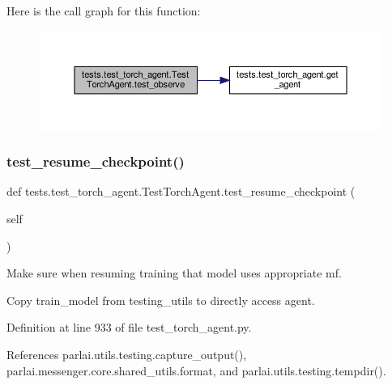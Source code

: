Here is the call graph for this function\+:
\nopagebreak
\begin{figure}[H]
\begin{center}
\leavevmode
\includegraphics[width=350pt]{classtests_1_1test__torch__agent_1_1TestTorchAgent_ae3b6e4145176ba5d5e9179756d064332_cgraph}
\end{center}
\end{figure}
\mbox{\label{classtests_1_1test__torch__agent_1_1TestTorchAgent_a7135ee3421b1d0fc98f0202718910482}} 
\subsubsection{\texorpdfstring{test\+\_\+resume\+\_\+checkpoint()}{test\_resume\_checkpoint()}}
{\footnotesize\ttfamily def tests.\+test\+\_\+torch\+\_\+agent.\+Test\+Torch\+Agent.\+test\+\_\+resume\+\_\+checkpoint (\begin{DoxyParamCaption}\item[{}]{self }\end{DoxyParamCaption})}

\begin{DoxyVerb}Make sure when resuming training that model uses appropriate mf.

Copy train_model from testing_utils to directly access agent.
\end{DoxyVerb}
 

Definition at line 933 of file test\+\_\+torch\+\_\+agent.\+py.



References parlai.\+utils.\+testing.\+capture\+\_\+output(), parlai.\+messenger.\+core.\+shared\+\_\+utils.\+format, and parlai.\+utils.\+testing.\+tempdir().

